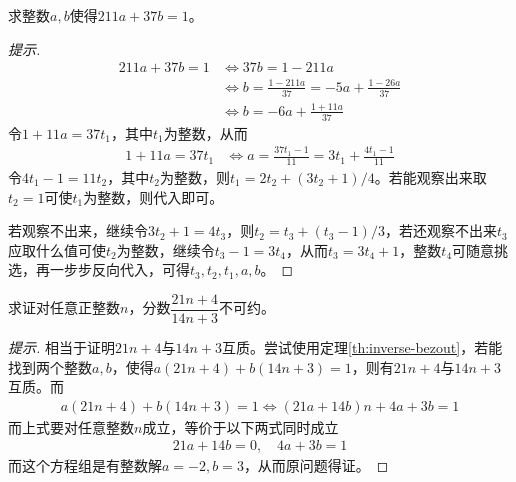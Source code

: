 \begin{example}
  求整数$a,b$使得$211a+37b=1$。
\end{example}
\begin{proof}[提示]
\begin{align*}
  211a+37b=1 &\iff 37b=1-211a \\
             &\iff b=\frac{1-211a}{37}=-5a+\frac{1-26a}{37}\\
             &\iff b=-6a+\frac{1+11a}{37} 
\end{align*}
令$1+11a=37t_1$，其中$t_1$为整数，从而
\begin{align*}
  1+11a=37t_1 & \iff a=\frac{37t_1-1}{11}=3t_1 + \frac{4t_1-1}{11}
\end{align*}
令$4t_1-1=11t_2$，其中$t_2$为整数，则$t_1=2t_2+(3t_2+1)/4$。若能观察出来取$t_2=1$可使$t_1$为整数，则代入即可。

若观察不出来，继续令$3t_2+1=4t_3$，则$t_2=t_3+(t_3-1)/3$，若还观察不出来$t_3$应取什么值可使$t_2$为整数，继续令$t_3-1=3t_4$，从而$t_3=3t_4+1$，整数$t_4$可随意挑选，再一步步反向代入，可得$t_3,t_2,t_1,a,b$。
\end{proof}



\begin{example}[1959 IMO]
  求证对任意正整数$n$，分数$\dfrac{21n+4}{14n+3}$不可约。
\end{example}
\begin{proof}[提示]
  相当于证明$21n+4$与$14n+3$互质。尝试使用定理\ref{th:inverse-bezout}，若能找到两个整数$a,b$，使得$a(21n+4)+b(14n+3)=1$，则有$21n+4$与$14n+3$互质。而
  \begin{align*}
    a(21n+4)+b(14n+3)=1 \iff (21a + 14b)n + 4a + 3b = 1
  \end{align*}
  而上式要对任意整数$n$成立，等价于以下两式同时成立
  \begin{align*}
    21a+14b=0, \quad 4a+3b=1
  \end{align*}
  而这个方程组是有整数解$a=-2, b=3$，从而原问题得证。
\end{proof}